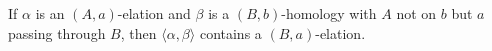 If $\alpha$ is an $(A, a)$-elation and $\beta$ is a $(B, b)$-homology with $A$ not on $b$ but $a$ passing through $B$, then $\langle \alpha, \beta \rangle$ contains a $(B, a)$-elation.
